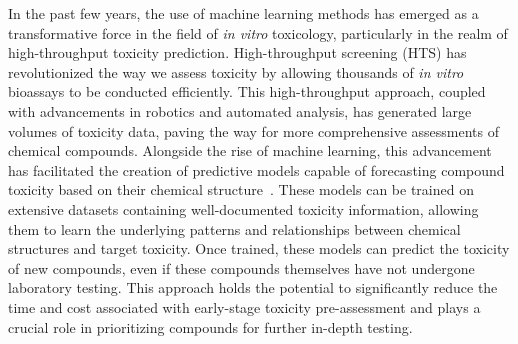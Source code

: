 In the past few years, the use of machine learning methods has emerged as a transformative force in the field of \emph{in vitro} toxicology, particularly in the realm of high-throughput toxicity prediction. High-throughput screening (HTS) has revolutionized the way we assess toxicity by allowing thousands of \emph{in vitro} bioassays to be conducted efficiently. This high-throughput approach, coupled with advancements in robotics and automated analysis, has generated large volumes of toxicity data, paving the way for more comprehensive assessments of chemical compounds.
Alongside the rise of machine learning, this advancement has facilitated the creation of predictive models capable of forecasting compound toxicity based on their chemical structure~\cite{banerjee2018}. These models can be trained on extensive datasets containing well-documented toxicity information, allowing them to learn the underlying patterns and relationships between chemical structures and target toxicity. Once trained, these models can predict the toxicity of new compounds, even if these compounds themselves have not undergone laboratory testing. This approach holds the potential to significantly reduce the time and cost associated with early-stage toxicity pre-assessment and plays a crucial role in prioritizing compounds for further in-depth testing.

